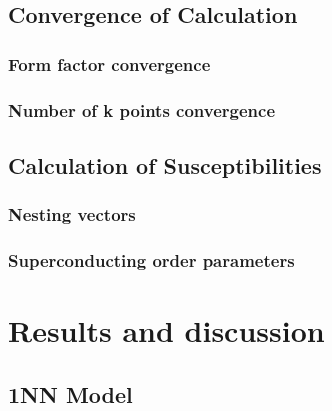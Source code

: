 \documentclass[12pt]{article}
\begin{document}
\subsection{Convergence of Calculation}

\subsubsection{Form factor convergence}

\subsubsection{Number of k points convergence }

\subsection{Calculation of Susceptibilities}

\subsubsection{Nesting vectors}

\subsubsection{Superconducting order parameters}

\section{Results and discussion}

\subsection{1NN Model}
\label{subsec:1NNModel}
\end{document}
